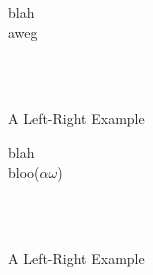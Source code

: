 \documentclass[class=article, crop=false]{standalone}
\begin{document}
\begin{landscape}
  \begin{figure}[th]
    \caption{A Left-Right Example}
    \begin{eventchain}[dir=right, dist=0.2cm]
      \state[5]
      \state
      \state
      \state
      \state
      \begin{event}[name=Event, dist=0.7cm]
        blah \\
        aweg \\
      \end{event}
      \state
      \begin{fluents}[name=State, dist=0.7cm, cols=2, fmt={c | l}]
         \\
         \\
      \end{fluents}
      \state
      \state
      \state
      \jumpto[100]
    \end{eventchain}
  \end{figure}

  \hrulefill

  \begin{figure}[bh]
    \begin{eventchain}[dir=right, dist=0.2cm]
      \state[5]
      \state
      \state
      \jumpto[10]
      \state
      \state
      \begin{event}[name=Event, dist=0.7cm]
        blah \\
        bloo($ \alpha \omega $) \\
      \end{event}
      \state
      \begin{fluents}[name=State, dist=0.7cm, cols=2, fmt={c | l}]
         \\
         \\
      \end{fluents}
      \state
      \state
      \state
      \jumpto[100]
    \end{eventchain}
    \caption{A Left-Right Example}
  \end{figure}
\end{landscape}




% 
% 
\end{document}
